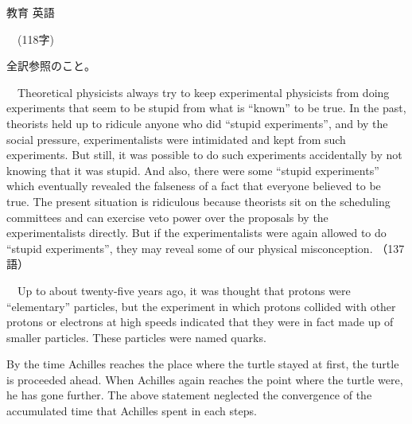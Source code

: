 \documentclass[fleqn]{jbook}
\begin{document}
\begin{answer}{教育 英語}{}
\begin{subanswers}
　(118字)


  \begin{subsubanswers} 
    \SubSubAnswer
            全訳参照のこと。
  
    \SubSubAnswer
\baselineskip=12pt

    　Theoretical physicists always try to keep experimental
    physicists from doing experiments that seem to be stupid from what
    is ``known'' to be true. In the past, theorists held up to
    ridicule anyone who did ``stupid experiments'', and by the social
    pressure, experimentalists were intimidated and kept from such
    experiments.  But still, it was possible to do such experiments
    accidentally by not knowing that it was stupid. And also, there
    were some ``stupid experiments'' which eventually revealed the
    falseness of a fact that everyone believed to be true. The present
    situation is ridiculous because theorists sit on the scheduling
    committees and can exercise veto power over the proposals by the
    experimentalists directly.  But if the experimentalists were again
    allowed to do ``stupid experiments'', they may reveal some of our
    physical misconception.  （137語）
  \end{subsubanswers}




\SubAnswer
    
    　Up to about twenty-five years ago, it was thought that
    protons were ``elementary'' particles, but the experiment in which
    protons collided with other protons or electrons at high speeds
    indicated that they were in fact made up of smaller
    particles. These particles were named quarks.


\SubAnswer

\begin{subsubanswers}

 \SubSubAnswer
  By the time Achilles reaches the place where the turtle stayed 
at first, the turtle is proceeded ahead. When Achilles again reaches
the point where the turtle were, he has gone further.
 \SubSubAnswer
  The above statement neglected the convergence of the accumulated
time that Achilles spent in each steps.

\baselineskip=15pt
\end{subsubanswers}

\end{subanswers}
\end{answer}
\end{document}
